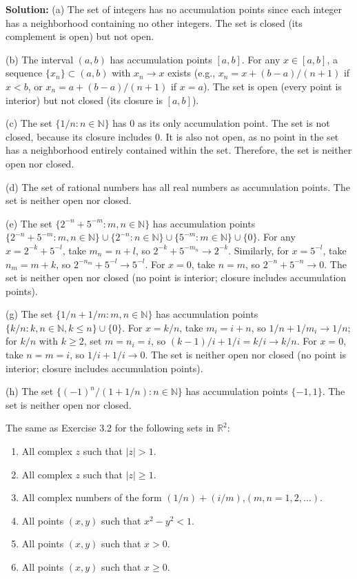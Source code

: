 \textbf{Solution:} 
(a) The set of integers has no accumulation points since each integer has a neighborhood containing no other integers. The set is closed (its complement is open) but not open.

(b) The interval $(a,b)$ has accumulation points $[a,b]$. For any $x \in [a,b]$, a sequence $\{x_n\} \subset (a,b)$ with $x_n \to x$ exists (e.g., $x_n = x + (b-a)/(n+1)$ if $x < b$, or $x_n = a + (b-a)/(n+1)$ if $x = a$). The set is open (every point is interior) but not closed (its closure is $[a,b]$).

(c) The set $\{1/n : n \in \mathbb{N}\}$ has 0 as its only accumulation point. The set is not closed, because its closure includes 0. It is also not open, as no point in the set has a neighborhood entirely contained within the set. Therefore, the set is neither open nor closed.


(d) The set of rational numbers has all real numbers as accumulation points. The set is neither open nor closed.

(e) The set $\{2^{-n} + 5^{-m} : m,n \in \mathbb{N}\}$ has accumulation points $\{2^{-n} + 5^{-m} : m,n \in \mathbb{N}\} \cup \{2^{-n} : n \in \mathbb{N}\} \cup \{5^{-m} : m \in \mathbb{N}\} \cup \{0\}$. For any $x = 2^{-k} + 5^{-l}$, take $m_n = n + l$, so $2^{-k} + 5^{-m_n} \to 2^{-k}$. Similarly, for $x = 5^{-l}$, take $n_m = m + k$, so $2^{-n_m} + 5^{-l} \to 5^{-l}$. For $x = 0$, take $n = m$, so $2^{-n} + 5^{-n} \to 0$. The set is neither open nor closed (no point is interior; closure includes accumulation points).

(g) The set $\{1/n + 1/m : m,n \in \mathbb{N}\}$ has accumulation points $\{k/n : k,n \in \mathbb{N}, k \leq n\} \cup \{0\}$. For $x = k/n$, take $m_i = i + n$, so $1/n + 1/m_i \to 1/n$; for $k/n$ with $k \geq 2$, set $m = n_i = i$, so $(k-1)/i + 1/i = k/i \to k/n$. For $x = 0$, take $n = m = i$, so $1/i + 1/i \to 0$. The set is neither open nor closed (no point is interior; closure includes accumulation points).

(h) The set $\{(-1)^n/(1+1/n) : n \in \mathbb{N}\}$ has accumulation points $\{-1, 1\}$. The set is neither open nor closed.

\begin{problembox}
The same as Exercise 3.2 for the following sets in $\mathbb{R}^2$:
\begin{enumerate}[label=\textbf{(\alph*)}]
\item All complex $z$ such that $|z| > 1$.
\item All complex $z$ such that $|z| \ge 1$.
\item All complex numbers of the form $(1/n) + (i/m)$,\quad $(m, n = 1, 2, \dots)$.
\item All points $(x, y)$ such that $x^2 - y^2 < 1$.
\item All points $(x, y)$ such that $x > 0$.
\item All points $(x, y)$ such that $x \ge 0$.
\end{enumerate}
\end{problembox}

